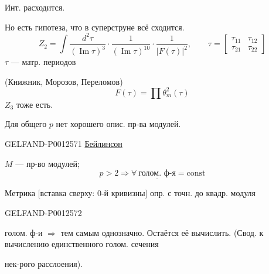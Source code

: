 Инт. расходится.

Но есть гипотеза, что в суперструне всё сходится.
\begin{equation*}
Z_2=\int\frac{d^2\tau}{(\operatorname{Im}\tau)^3}
\cdot\frac{1}{(\operatorname{Im}\tau)^{10}}\cdot\frac{1}{\lvert F(\tau)\rvert^2},
\qquad
\tau=\begin{bmatrix}\tau_{11}&\tau_{12}\\\tau_{21}&\tau_{22}\end{bmatrix}
\end{equation*}
$\tau$ — матр. периодов

(Книжник, Морозов, Переломов)
\begin{equation*}
F(\tau)=\prod\theta_m^2(\tau)
\end{equation*}
$Z_3$ тоже есть.

Для общего $p$ нет хорошего опис. пр-ва модулей.


\begin{GelfandAdjacentEvidence}{GELFAND-P001257}{1}
\underline{Бейлинсон}

$M$ — пр-во модулей;
\[
p>2\Rightarrow\forall\ \underline{\text{голом. ф-я}}=\mathrm{const}
\]

Метрика [вставка сверху: 0-й кривизны] опр. с точн. до квадр. модуля
\end{GelfandAdjacentEvidence}
\begin{GelfandAdjacentEvidence}{GELFAND-P001257}{2}

голом. ф-и $\Rightarrow$ тем самым однозначно.
Остаётся её вычислить. (Свод. к вычислению единственного голом. сечения
\end{GelfandAdjacentEvidence}

нек-рого расслоения).


